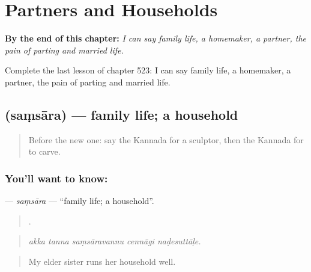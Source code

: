 
\chapter{Partners and Households}
\label{ch:ka-partners-and-households}

\begin{chapteropening}
\textbf{By the end of this chapter:} \emph{I can say family life, a homemaker, a partner, the pain of parting and married life.}

Complete the last lesson of chapter 523: I can say family life, a homemaker, a partner, the pain of parting and married life.
\end{chapteropening}

\section[\texorpdfstring{\kn{ಸಂಸಾರ} (saṃsāra)}{ಸಂಸಾರ (saṃsāra)}]{ (saṃsāra) — family life; a household}

\label{lesson:KA-C523-samsara}



\begin{quote}
Before the new one: say the Kannada for a sculptor, then the Kannada for to carve.
\end{quote}

\subsection*{You'll want to know: }
\textbf{} — \emph{saṃsāra} — \textquotedblleft{}family life; a household\textquotedblright{}.

\begin{quote}
    .
\end{quote}

\begin{quote}
\emph{akka tanna saṃsāravannu cennāgi naḍesuttāḷe.}
\end{quote}

\begin{quote}
My elder sister runs her household well.
\end{quote}

